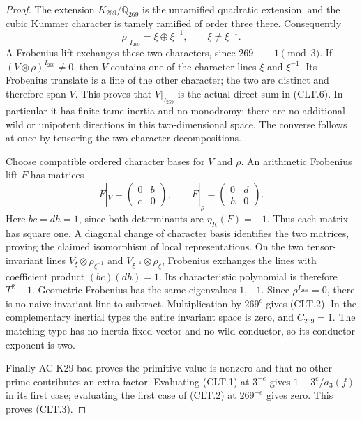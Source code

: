\begin{proof}
The extension $K_{269}/\mathbb Q_{269}$ is the
unramified quadratic extension, and the cubic Kummer
character is tamely ramified of order three there.
Consequently
\[
                \rho|_{I_{269}}=\xi\oplus\xi^{-1},
                    \qquad \xi\ne\xi^{-1}.
                                                               \tag{CLT.6}
\]
A Frobenius lift exchanges these two characters, since
$269\equiv-1\pmod3$.
If $(V\otimes\rho)^{I_{269}}\ne0$, then $V$ contains
one of the character lines $\xi$ and $\xi^{-1}$.
Its Frobenius translate is a line of the other character;
the two are distinct and therefore span $V$.
This proves that $V|_{I_{269}}$ is the actual direct
sum in (CLT.6).  In particular it has finite tame
inertia and no monodromy; there are no additional wild
or unipotent directions in this two-dimensional space.
The converse follows at once by tensoring the two
character decompositions.

Choose compatible ordered character bases for $V$ and
$\rho$.  An arithmetic Frobenius lift $F$ has matrices
\[
 F|_V=\begin{pmatrix}0&b\\c&0\end{pmatrix},
 \qquad
 F|_\rho=\begin{pmatrix}0&d\\h&0\end{pmatrix}.
                                                               \tag{CLT.7}
\]
Here $bc=dh=1$, since both determinants are
$\eta_K(F)=-1$.
Thus each matrix has square one.  A diagonal change
of character basis identifies the two matrices,
proving the claimed isomorphism of local
representations.  On the two tensor-invariant lines
$V_\xi\otimes\rho_{\xi^{-1}}$ and
$V_{\xi^{-1}}\otimes\rho_\xi$, Frobenius exchanges
the lines with coefficient product $(bc)(dh)=1$.
Its characteristic polynomial is therefore $T^2-1$.
Geometric Frobenius has the same eigenvalues $1,-1$.
Since $\rho^{I_{269}}=0$, there is no naive invariant
line to subtract.  Multiplication by $269^e$ gives
(CLT.2).
In the complementary inertial types the entire invariant
space is zero, and $C_{269}=1$.
The matching type has no inertia-fixed vector and no
wild conductor, so its conductor exponent is two.

Finally AC-K29-bad proves the primitive value is
nonzero and that no other prime contributes an extra
factor.  Evaluating (CLT.1) at $3^{-e}$ gives
$1-3^e/a_3(f)$ in its first case; evaluating the first
case of (CLT.2) at $269^{-e}$ gives zero.
This proves (CLT.3).
\end{proof}

